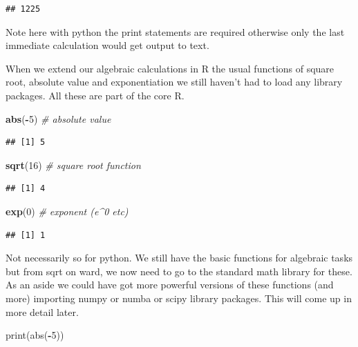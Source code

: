 \documentclass[]{book}
\newenvironment{Shaded}{\begin{snugshade}}{\end{snugshade}}
\newcommand{\KeywordTok}[1]{\textcolor[rgb]{0.13,0.29,0.53}{\textbf{#1}}}
\newcommand{\DecValTok}[1]{\textcolor[rgb]{0.00,0.00,0.81}{#1}}
\newcommand{\CommentTok}[1]{\textcolor[rgb]{0.56,0.35,0.01}{\textit{#1}}}
\newcommand{\OperatorTok}[1]{\textcolor[rgb]{0.81,0.36,0.00}{\textbf{#1}}}
\newcommand{\BuiltInTok}[1]{#1}
\newcommand{\NormalTok}[1]{#1}
\theoremstyle{definition}
\theoremstyle{definition}
\theoremstyle{definition}
\theoremstyle{remark}
\begin{document}
\begin{verbatim}
## 1225
\end{verbatim}

Note here with python the print statements are required otherwise only
the last immediate calculation would get output to text.

When we extend our algebraic calculations in R the usual functions of
square root, absolute value and exponentiation we still haven't had to
load any library packages. All these are part of the core R.

\begin{Shaded}
\begin{Highlighting}[]
\KeywordTok{abs}\NormalTok{(}\OperatorTok{-}\DecValTok{5}\NormalTok{)          }\CommentTok{# absolute value}
\end{Highlighting}
\end{Shaded}

\begin{verbatim}
## [1] 5
\end{verbatim}

\begin{Shaded}
\begin{Highlighting}[]
\KeywordTok{sqrt}\NormalTok{(}\DecValTok{16}\NormalTok{)         }\CommentTok{# square root function}
\end{Highlighting}
\end{Shaded}

\begin{verbatim}
## [1] 4
\end{verbatim}

\begin{Shaded}
\begin{Highlighting}[]
\KeywordTok{exp}\NormalTok{(}\DecValTok{0}\NormalTok{)           }\CommentTok{# exponent (e^0 etc)}
\end{Highlighting}
\end{Shaded}

\begin{verbatim}
## [1] 1
\end{verbatim}

Not necessarily so for python. We still have the basic functions for
algebraic tasks but from sqrt on ward, we now need to go to the standard
math library for these. As an aside we could have got more powerful
versions of these functions (and more) importing numpy or numba or scipy
library packages. This will come up in more detail later.

\begin{Shaded}
\begin{Highlighting}[]
\BuiltInTok{print}\NormalTok{(}\BuiltInTok{abs}\NormalTok{(}\OperatorTok{-}\DecValTok{5}\NormalTok{))}
\end{Highlighting}
\end{Shaded}
\end{document}
